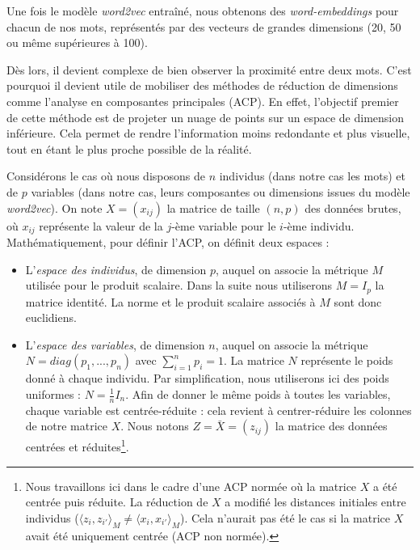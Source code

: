 \documentclass[11pt,french,french]{article}
\let\rmarkdownfootnote\footnote%
\def\footnote{\protect\rmarkdownfootnote}
\begin{document}
Une fois le modèle \emph{word2vec} entraîné, nous obtenons des
\emph{word-embeddings} pour chacun de nos mots, représentés par des
vecteurs de grandes dimensions (20, 50 ou même supérieures à 100).

Dès lors, il devient complexe de bien observer la proximité entre deux
mots. C'est pourquoi il devient utile de mobiliser des méthodes de
réduction de dimensions comme l'analyse en composantes principales
(ACP). En effet, l'objectif premier de cette méthode est de projeter un
nuage de points sur un espace de dimension inférieure. Cela permet de
rendre l'information moins redondante et plus visuelle, tout en étant le
plus proche possible de la réalité.

Considérons le cas où nous disposons de \(n\) individus (dans notre cas
les mots) et de \(p\) variables (dans notre cas, leurs composantes ou
dimensions issues du modèle \emph{word2vec}). On note \(X = (x_{ij})\)
la matrice de taille \((n,p)\) des données brutes, où \(x_{ij}\)
représente la valeur de la \(j\)-ème variable pour le \(i\)-ème
individu. Mathématiquement, pour définir l'ACP, on définit deux espaces
:

\begin{itemize}
\item
  L'\emph{espace des individus}, de dimension \(p\), auquel on associe
  la métrique \(M\) utilisée pour le produit scalaire. Dans la suite
  nous utiliserons \(M =I_p\) la matrice identité. La norme et le
  produit scalaire associés à \(M\) sont donc euclidiens.
\item
  L'\emph{espace des variables}, de dimension \(n\), auquel on associe
  la métrique \(N=diag(p_1,...,p_n)\) avec \(\sum_{i=1}^np_i=1\). La
  matrice \(N\) représente le poids donné à chaque individu. Par
  simplification, nous utiliserons ici des poids uniformes :
  \(N=\frac{1}{n}I_n\). Afin de donner le même poids à toutes les
  variables, chaque variable est centrée-réduite : cela revient à
  centrer-réduire les colonnes de notre matrice \(X\). Nous notons
  \(Z =\bar X= (z_{ij})\) la matrice des données centrées et
  réduites\footnote{Nous travaillons ici dans le cadre d'une ACP normée
    où la matrice \(X\) a été centrée puis réduite. La réduction de
    \(X\) a modifié les distances initiales entre individus
    (\(\langle z_i,z_{i'}\rangle_M \neq \langle x_i,x_{i'}\rangle_M\)).
    Cela n'aurait pas été le cas si la matrice \(X\) avait été
    uniquement centrée (ACP non normée).}.
\end{itemize}
\end{document}
